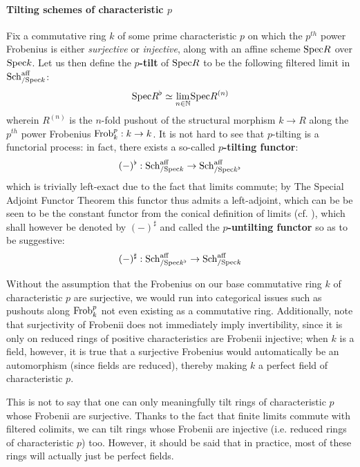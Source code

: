                 \paragraph{Tilting schemes of characteristic \texorpdfstring{$p$}{}}
                    \begin{definition} \label{def: tilting_schemes}
                        Fix a commutative ring $k$ of some prime characteristic $p$ on which the $p^{th}$ power Frobenius is either \textit{surjective} or \textit{injective}, along with an affine scheme $\mathrm{Spec} R$ over $\mathrm{Spec} k$. Let us then define the \textbf{$p$-tilt} of $\mathrm{Spec} R$ to be the following filtered limit in $\mathrm{Sch}^{\mathrm{aff}}_{/\mathrm{Spec} k}$:
                            $$\mathrm{Spec} R^{\flat} \simeq \underset{n \in \mathbb{N}}{\operatorname{lim}} \mathrm{Spec} R^{(n)}$$
                        wherein $R^{(n)}$ is the $n$-fold pushout of the structural morphism $k \to R$ along the $p^{th}$ power Frobenius $\mathrm{Frob}_k^p: k \to k$. It is not hard to see that $p$-tilting is a functorial process: in fact, there exists a so-called \textbf{$p$-tilting functor}:
                            $$(-)^{\flat}: \mathrm{Sch}^{\mathrm{aff}}_{/\mathrm{Spec} k} \to \mathrm{Sch}^{\mathrm{aff}}_{/\mathrm{Spec} k^{\flat}}$$
                        which is trivially left-exact due to the fact that limits commute; by The Special Adjoint Functor Theorem \cite[Theorem V.8.2]{maclane} this functor thus admits a left-adjoint, which can be be seen to be the constant functor from the conical definition of limits (cf. \cite[Section 3]{nlab:limit}), which shall however be denoted by $(-)^{\sharp}$ and called the \textbf{$p$-untilting functor} so as to be suggestive:
                            $$(-)^{\sharp}: \mathrm{Sch}^{\mathrm{aff}}_{/\mathrm{Spec} k^{\flat}} \to \mathrm{Sch}^{\mathrm{aff}}_{/\mathrm{Spec} k}$$
                    \end{definition}
                    \begin{remark} \label{remark: surjective_frobenii}
                        Without the assumption that the Frobenius on our base commutative ring $k$ of characteristic $p$ are surjective, we would run into categorical issues such as pushouts along $\mathrm{Frob}^p_k$ not even existing as a commutative ring. Additionally, note that surjectivity of Frobenii does not immediately imply invertibility, since it is only on reduced rings of positive characteristics are Frobenii injective; when $k$ is a field, however, it is true that a surjective Frobenius would automatically be an automorphism (since fields are reduced), thereby making $k$ a perfect field of characteristic $p$. 
                        
                        This is not to say that one can only meaningfully tilt rings of characteristic $p$ whose Frobenii are surjective. Thanks to the fact that finite limits commute with filtered colimits, we can tilt rings whose Frobenii are injective (i.e. reduced rings of characteristic $p$) too. However, it should be said that in practice, most of these rings will actually just be perfect fields. 
                    \end{remark}
                    
